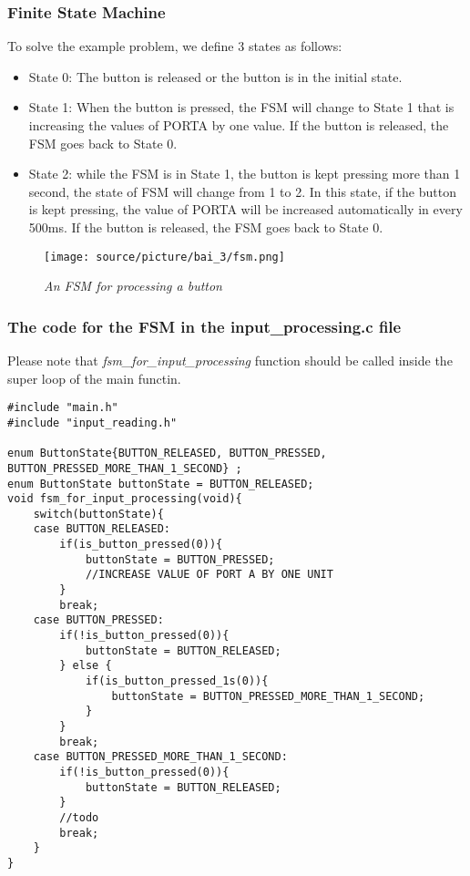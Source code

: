 \subsubsection {Finite State Machine}
To solve the example problem, we define 3 states as follows:
\begin{itemize}
    \item State 0: The button is released or the button is in the initial state. 
    \item State 1: When the button is pressed, the FSM will change to State 1 that is increasing the values of PORTA by one value. If the button is released, the FSM goes back to State 0.
    \item State 2: while the FSM is in State 1, the button is kept pressing more than 1 second, the state of FSM will change from 1 to 2. In this state, if the button is kept pressing, the value of PORTA will be increased automatically in every 500ms. If the button is released, the FSM goes back to State 0.
\end{itemize}
\begin{figure}[!htp]
    \centering
    \texttt{[image: source/picture/bai\_3/fsm.png]}
    \caption{\textit{An FSM for processing a button}}
    \label{bai4_pic_fsm_for_button_processing}
\end{figure}
\newpage
\subsubsection{The code for the FSM in the input\_processing.c file}
Please note that \emph{fsm\_for\_input\_processing} function should be called inside the super loop of the main functin. 
\begin{lstlisting}[caption=The code in the input\_processing.c file]
#include "main.h"
#include "input_reading.h"

enum ButtonState{BUTTON_RELEASED, BUTTON_PRESSED, BUTTON_PRESSED_MORE_THAN_1_SECOND} ;
enum ButtonState buttonState = BUTTON_RELEASED;
void fsm_for_input_processing(void){
	switch(buttonState){
	case BUTTON_RELEASED:
		if(is_button_pressed(0)){
			buttonState = BUTTON_PRESSED;
			//INCREASE VALUE OF PORT A BY ONE UNIT
		}
		break;
	case BUTTON_PRESSED:
		if(!is_button_pressed(0)){
			buttonState = BUTTON_RELEASED;
		} else {
			if(is_button_pressed_1s(0)){
				buttonState = BUTTON_PRESSED_MORE_THAN_1_SECOND;
			}
		}
		break;
	case BUTTON_PRESSED_MORE_THAN_1_SECOND:
		if(!is_button_pressed(0)){
			buttonState = BUTTON_RELEASED;
		}
		//todo
		break;
	}
}
\end{lstlisting}
